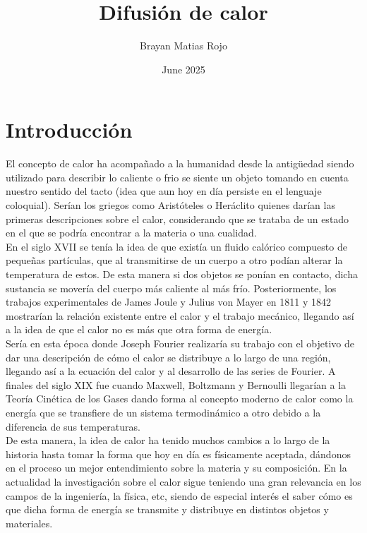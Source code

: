 \documentclass[12pt]{article}
\title{Difusión de calor}
\author{Brayan Matias Rojo}
\date{June 2025}
\begin{document}
\tableofcontents

\newpage

\section{Introducción}

El concepto de calor ha acompañado a la humanidad desde la antigüedad siendo utilizado para describir lo caliente o frio se siente un objeto tomando en cuenta nuestro sentido del tacto (idea que aun hoy en día persiste en el lenguaje coloquial). Serían los griegos como Aristóteles o Heráclito quienes darían las primeras descripciones sobre el calor, considerando que se trataba de un estado en el que se podría encontrar a la materia o una cualidad. \\

En el siglo XVII se tenía la idea de que existía un fluido calórico compuesto de pequeñas partículas, que al transmitirse de un cuerpo a otro podían alterar la temperatura de estos. De esta manera si dos objetos se ponían en contacto, dicha sustancia se movería del cuerpo más caliente al más frío. Posteriormente, los trabajos experimentales de James Joule y Julius von Mayer en 1811 y 1842 mostrarían la relación existente entre el calor y el trabajo mecánico, llegando así a la idea de que el calor no es más que otra forma de energía. \\

Sería en esta época donde Joseph Fourier realizaría su trabajo con el objetivo de dar una descripción de cómo el calor se distribuye a lo largo de una región, llegando así a la ecuación del calor y al desarrollo de las series de Fourier. A finales del siglo XIX fue cuando Maxwell, Boltzmann y Bernoulli llegarían a la Teoría Cinética de los Gases dando forma al concepto moderno de calor como la energía que se transfiere de un sistema termodinámico a otro debido a la diferencia de sus temperaturas. \\

De esta manera, la idea de calor ha tenido muchos cambios a lo largo de la historia hasta tomar la forma que hoy en día es físicamente aceptada, dándonos en el proceso un mejor entendimiento sobre la materia y su composición. En la actualidad la investigación sobre el calor sigue teniendo una gran relevancia en los campos de la ingeniería, la física, etc, siendo de especial interés el saber cómo es que dicha forma de energía se transmite y distribuye en distintos objetos y materiales. \\
\end{document}
